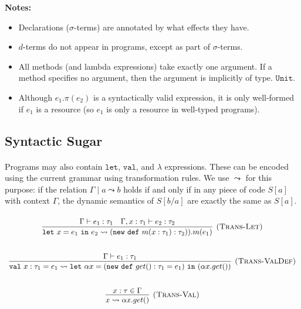 \documentclass{llncs}
\newcommand{\keywadj}[1]{\mathtt{#1}}
\newcommand{\keyw}[1]{\keywadj{#1}~}
\begin{document}
\noindent \textbf{Notes:}

\begin{itemize}
	\item Declarations ($\sigma$-terms) are annotated by what effects they have.
	\item $d$-terms do not appear in programs, except as part of $\sigma$-terms.
	\item All methods (and lambda expressions) take exactly one argument. If a method specifies no argument, then the argument is implicitly of type.
	 $\keywadj{Unit}$.
	\item Although $e_1.\pi(e_2)$ is a syntactically valid expression, it is only well-formed if $e_1$ is a resource (so $e_1$ is only a resource in well-typed programs).
\end{itemize}


\subsection{Syntactic Sugar}

\paragraph{}
Programs may also contain $\keywadj{let}$, $\keywadj{val}$, and $\lambda$ expressions. These can be encoded using the current grammar using transformation rules. We use $\leadsto$ for this purpose: if the relation $\Gamma \mid a \leadsto b$ holds if and only if in any piece of code $S[a]$ with context $\Gamma$, the dynamic semantics of $S[b/a]$ are exactly the same as $S[a]$.

\paragraph{}

\[
\begin{array}{c}
	
\infer[\textsc{(Trans-Let)}]
	{ \keyw{let} x = e_1~\keyw{in} e_2  \leadsto (\keyw{new~def}m(x : \tau_1) : \tau_2)).m(e_1) }
	{\Gamma \vdash e_1 : \tau_1 & \Gamma, x : \tau_1 \vdash e_2 : \tau_2} \\[5ex]

\infer[\textsc{(Trans-ValDef)}]
	{\keyw{val} x : \tau_1 = e_1 \leadsto \keyw{let} \alpha x = (\keyw{new~def}get() : \tau_1 = e_1)~\keyw{in} (\alpha x.get())}
	{\Gamma \vdash e_1 : \tau_1} \\[5ex]

\infer[\textsc{(Trans-Val)}]
	{x \leadsto \alpha x.get() }
	{x : \tau \in \Gamma} \\[5ex]

\end{array}
\]	
\end{document}
